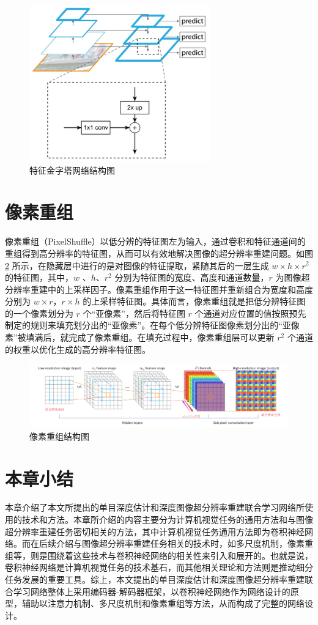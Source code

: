 \begin{figure}[!htbp]
	\centering
	\includegraphics{figures/15.png}
	\caption{特征金字塔网络结构图}
	\label{fig:fig2-14}
\end{figure}

\section{像素重组}

像素重组（PixelShuffle）以低分辨的特征图左为输入，通过卷积和特征通道间的重组得到高分辨率的特征图，从而可以有效地解决图像的超分辨率重建问题。如图 \ref{fig:fig2-15} 所示，在隐藏层中进行的是对图像的特征提取，紧随其后的一层生成 $w\times h\times r^2$ 的特征图，其中，$w$ 、$h$、$r^2$ 分别为特征图的宽度、高度和通道数量，$r$ 为图像超分辨率重建中的上采样因子。像素重组作用于这一特征图并重新组合为宽度和高度分别为 $w\times r$，$r\times h$ 的上采样特征图。具体而言，像素重组就是把低分辨特征图的一个像素划分为 $r$ 个“亚像素”，然后将特征图 $r$ 个通道对应位置的值按照预先制定的规则来填充划分出的“亚像素”。在每个低分辨特征图像素划分出的“亚像素”被填满后，就完成了像素重组。在填充过程中，像素重组层可以更新 $r^2$ 个通道的权重以优化生成的高分辨率特征图。

\begin{figure}[!htbp]
	\centering
	\includegraphics{figures/16.png}
	\caption{像素重组结构图}
	\label{fig:fig2-15}
\end{figure}


\section{本章小结}
本章介绍了本文所提出的单目深度估计和深度图像超分辨率重建联合学习网络所使用的技术和方法。本章所介绍的内容主要分为计算机视觉任务的通用方法和与图像超分辨率重建任务密切相关的方法，其中计算机视觉任务通用方法即为卷积神经网络。而在后续介绍与图像超分辨率重建任务相关的技术时，如多尺度机制，像素重组等，则是围绕着这些技术与卷积神经网络的相关性来引入和展开的。也就是说，卷积神经网络是计算机视觉任务的技术基石，而其他相关理论和方法则是推动细分任务发展的重要工具。综上，本文提出的单目深度估计和深度图像超分辨率重建联合学习网络整体上采用编码器-解码器框架，以卷积神经网络作为网络设计的原型，辅助以注意力机制、多尺度机制和像素重组等方法，从而构成了完整的网络设计。 

